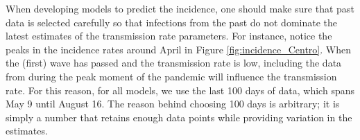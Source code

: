 \documentclass[12pt]{article}
\begin{document}
	
	
	When developing models to predict the incidence, one should make sure that past data is selected carefully so that infections from the past do not dominate the latest estimates of the transmission rate parameters. For instance, notice the peaks in the incidence rates around April in Figure \ref{fig:incidence_Centro}. When the (first) wave has passed and the transmission rate is low, including the data from during the peak moment of the pandemic will influence the transmission rate. For this reason, for all models, we use the last 100 days of data, which spans May 9 until August 16. The reason behind choosing 100 days is arbitrary; it is simply a number that retains enough data points while providing variation in the estimates. 
	\\
	
	
	
	
\end{document}
